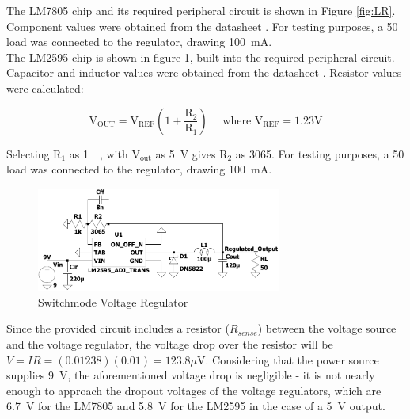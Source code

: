 The LM7805 chip and its required peripheral circuit is shown in Figure \ref{fig:LR}. Component values were obtained from the datasheet \cite{lm7805}. For testing purposes, a \SI{50}{\Omega} load was connected to the regulator, drawing \SI{100}{mA}.\\

The LM2595 chip is shown in figure \ref{fig:SM}, built into the required peripheral circuit. Capacitor and inductor values were obtained from the datasheet \cite{lm2595}. Resistor values were calculated:

$$\mathrm{V}_{\mathrm{OUT}}=\mathrm{V}_{\mathrm{REF}}\left(1+\frac{\mathrm{R}_{2}}{\mathrm{R}_{1}}\right) \quad \text { where } \mathrm{V}_{\mathrm{REF}}=1.23 \mathrm{V}$$

Selecting $\mathrm{R_1}$ as \SI{1}{\kilo\Omega}, with $\mathrm{V_{out}}$ as \SI{5}{\volt} gives $\mathrm{R_2}$ as \SI{3065}{\Omega}. For testing purposes, a \SI{50}{\Omega} load was connected to the regulator, drawing \SI{100}{mA}.\\
\pagebreak 

\begin{figure}
    \centering
    \includegraphics[width = 0.72\textwidth]{Figures/SM.pdf}
    \caption{Switchmode Voltage Regulator}
    \label{fig:SM}
\end{figure}

Since the provided circuit includes a resistor ($R_{sense}$) between the voltage source and the voltage regulator, the voltage drop over the resistor will be $V = IR = (0.01238)(0.01) = 123.8\mu \mathrm{V}$. Considering that the power source supplies \SI{9}{V}, the aforementioned voltage drop is negligible - it is not nearly enough to approach the dropout voltages of the voltage regulators, which are \SI{6.7}{\volt} for the LM7805 and \SI{5.8}{\volt} for the LM2595 in the case of a \SI{5}{\volt} output.

